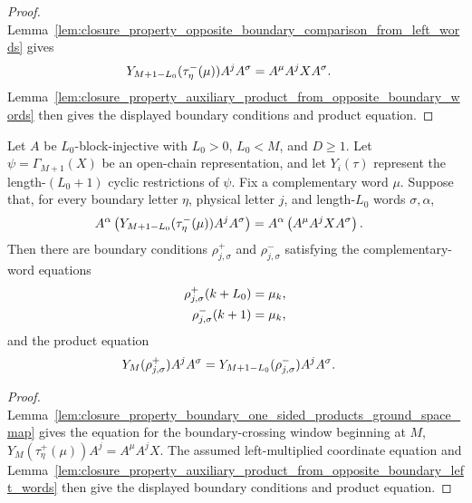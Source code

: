 \begin{proof}
    \leanok
    Lemma~\ref{lem:closure_property_opposite_boundary_comparison_from_left_words}
    gives
    \begin{align}
        Y_{M+1-L_0}(\tau^-_\eta(\mu))A^jA^\sigma
         & =
        A^\mu A^jXA^\sigma.
        \notag
    \end{align}
    Lemma~\ref{lem:closure_property_auxiliary_product_from_opposite_boundary_words}
    then gives the displayed boundary conditions and product equation.
\end{proof}

\begin{lemma}
    \label{thm:closure_property_auxiliary_boundary_product_ground_space_left_words}
    \leanok
    Let $A$ be $L_0$-block-injective with $L_0>0$, $L_0<M$, and
    $D\ge1$. Let $\psi=\Gamma_{M+1}(X)$ be an open-chain representation,
    and let $Y_i(\tau)$ represent the length-$(L_0+1)$ cyclic restrictions of
    $\psi$. Fix a complementary word $\mu$. Suppose that, for every boundary
    letter $\eta$, physical letter $j$, and length-$L_0$ words
    $\sigma,\alpha$,
    \begin{align}
        A^\alpha
        \left(Y_{M+1-L_0}(\tau^-_\eta(\mu))A^jA^\sigma\right)
         & =
        A^\alpha\left(A^\mu A^jXA^\sigma\right).
        \notag
    \end{align}
    Then there are boundary conditions $\rho^+_{j,\sigma}$ and
    $\rho^-_{j,\sigma}$ satisfying the complementary-word equations
    \begin{align}
        \rho^+_{j,\sigma}(k+L_0)
         & =
        \mu_k,
        \notag \\
        \rho^-_{j,\sigma}(k+1)
         & =
        \mu_k,
        \notag
    \end{align}
    and the product equation
    \begin{align}
        Y_M(\rho^+_{j,\sigma})A^jA^\sigma
         & =
        Y_{M+1-L_0}(\rho^-_{j,\sigma})A^jA^\sigma.
        \notag
    \end{align}
\end{lemma}

\begin{proof}
    \leanok
    Lemma~\ref{lem:closure_property_boundary_one_sided_products_ground_space_map}
    gives the equation for the boundary-crossing window beginning at $M$,
    $Y_M(\tau^+_\eta(\mu))A^j = A^\mu A^jX$.
    The assumed left-multiplied coordinate equation and
    Lemma~\ref{lem:closure_property_auxiliary_product_from_opposite_boundary_left_words}
    then give the displayed boundary conditions and product equation.
\end{proof}


